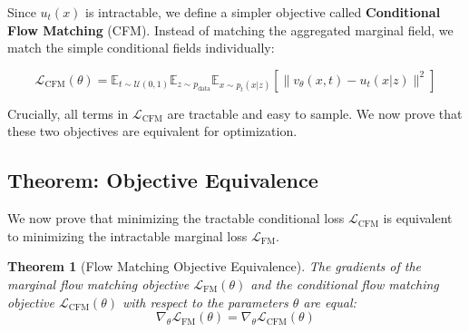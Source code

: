 \documentclass{book}
\newtheorem{theorem}{Theorem}
\begin{document}
Since $u_t(x)$ is intractable, we define a simpler objective called \textbf{Conditional Flow Matching} (CFM). Instead of matching the aggregated marginal field, we match the simple conditional fields individually:

\begin{equation} \label{eq:loss_cfm}
\mathcal{L}_{\text{CFM}}(\theta) = \mathbb{E}_{t \sim \mathcal{U}(0,1)} \mathbb{E}_{z \sim p_{\text{data}}} \mathbb{E}_{x \sim p_t(x|z)} \left[ \| v_\theta(x, t) - u_t(x|z) \|^2 \right]
\end{equation}

Crucially, all terms in $\mathcal{L}_{\text{CFM}}$ are tractable and easy to sample. We now prove that these two objectives are equivalent for optimization.

\subsection{Theorem: Objective Equivalence}

We now prove that minimizing the tractable conditional loss $\mathcal{L}_{\text{CFM}}$ is equivalent to minimizing the intractable marginal loss $\mathcal{L}_{\text{FM}}$.

\begin{theorem}[Flow Matching Objective Equivalence]
The gradients of the marginal flow matching objective $\mathcal{L}_{\text{FM}}(\theta)$ and the conditional flow matching objective $\mathcal{L}_{\text{CFM}}(\theta)$ with respect to the parameters $\theta$ are equal:
\begin{equation}
\nabla_\theta \mathcal{L}_{\text{FM}}(\theta) = \nabla_\theta \mathcal{L}_{\text{CFM}}(\theta)
\end{equation}
\end{theorem}
\end{document}
